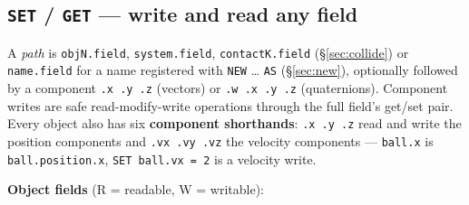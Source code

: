 \documentclass[11pt]{article}
\newcommand{\kw}[1]{\texttt{\uppercase{#1}}}
\newcommand{\code}[1]{\texttt{#1}}
\begin{document}
\subsection{\kw{set} / \kw{get} --- write and read any field}

A \emph{path} is \code{objN.field}, \code{system.field},
\code{contactK.field} (\S\ref{sec:collide}) or \code{name.field} for
a name registered with \kw{new} \ldots{} \kw{as}
(\S\ref{sec:new}), optionally followed by a component
\code{.x .y .z} (vectors) or \code{.w .x .y .z} (quaternions).
Component writes are safe read-modify-write operations through the
full field's get/set pair. Every object also has six
\textbf{component shorthands}: \code{.x .y .z} read and write the
position components and \code{.vx .vy .vz} the velocity components
--- \code{ball.x} is \code{ball.position.x}, \code{SET ball.vx = 2}
is a velocity write.

\textbf{Object fields} (R = readable, W = writable):
\end{document}
